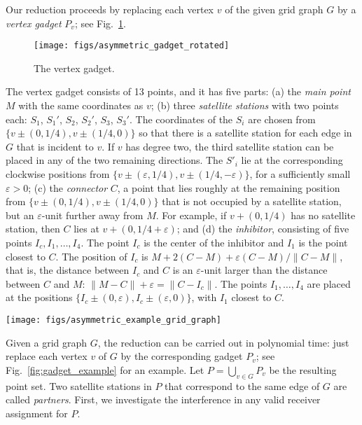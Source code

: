\documentclass[envcountsect,envcountsame,runningheads,a4paper]{llncs}
\newcommand{\eps}{\varepsilon}
\begin{document}
Our reduction proceeds by replacing each vertex $v$
of the given grid graph $G$ by a \emph{vertex gadget} $P_v$;
see Fig.~\ref{fig:gadget_bare}.
\begin{figure}[b]
  \centering
  \texttt{[image: figs/asymmetric\_gadget\_rotated]}
  \caption{The vertex gadget. }
  \label{fig:gadget_bare}
\end{figure}
The vertex gadget consists of 13 points, and it has five parts:
(a) the \emph{main point} $M$ with
the same coordinates as $v$;
(b) three \emph{satellite stations}
with two points each: $S_1$, $S_1'$,
$S_2$, $S_2'$, $S_3$, $S_3'$.
The coordinates of the $S_i$ are
chosen from $\{v\pm (0,1/4), v \pm (1/4,0)\}$
so that there is a satellite station for each
edge in $G$ that is incident to $v$. If $v$ has degree two, the third 
satellite station can be placed in any of the two remaining directions.
The $S'_i$ lie
at the corresponding clockwise positions from
$\{v\pm (\eps,1/4), v \pm (1/4,-\eps)\}$,
for a sufficiently small $\eps > 0$;
(c) the \emph{connector} $C$, a point
that lies roughly at the remaining position from
$\{v \pm (0,1/4), v \pm (1/4,0)\}$ that is
not occupied by a satellite station, but
an $\eps$-unit further away from $M$. For example,
if $v+(0,1/4)$ has no satellite station, then $C$ lies
at $v+(0,1/4+\eps)$; and
(d) the \emph{inhibitor}, consisting of five
points $I_c, I_1, \dots, I_4$.
The point $I_c$ is the center of the inhibitor
and $I_1$ is the point closest to $C$.
The position of $I_c$ is
$M + 2(C-M) +\eps(C-M)/\|C-M\|$, that is,
the distance between $I_c$ and
$C$ is an $\eps$-unit larger than the distance  between $C$
and $M$:
$\|M-C\|+\eps = \|C-I_c\|$.
The points $I_1, \dots, I_4$ are placed at
the positions $\{I_c \pm (0,\eps), I_c \pm (\eps,0)\}$,
with $I_1$ closest to $C$.

\begin{figure*}
  \centering
  \texttt{[image: figs/asymmetric\_example\_grid\_graph]}
  \caption{An example reduction.}
  \label{fig:gadget_example}
\end{figure*}

Given a grid graph $G$, the reduction can be
carried out in polynomial time: just replace each
vertex $v$ of $G$ by the corresponding gadget $P_v$; see
Fig.~\ref{fig:gadget_example} for an example.
Let $P = \bigcup_{v \in G} P_v$ be the resulting point set.
Two satellite stations in $P$ that correspond to the same
edge of $G$ are called \emph{partners}.
First, we investigate the interference in any valid
receiver assignment for $P$.
\end{document}
